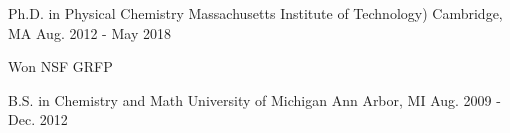 

\begin{cventries}

  \cventry
    {Ph.D. in Physical Chemistry} %
    {Massachusetts Institute of Technology)} %
    {Cambridge, MA} %
    {Aug. 2012 - May 2018} %
    {
      \begin{cvitems} %
        \item {Won NSF GRFP}
      \end{cvitems}
    }
    
  \cventry
    {B.S. in Chemistry and Math} %
    {University of Michigan} %
    {Ann Arbor, MI} %
    {Aug. 2009 - Dec. 2012} %
    {}

\end{cventries}
